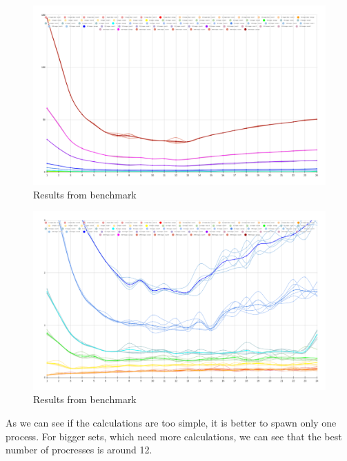 \begin{figure}[H]
    \centering
    \includegraphics[width=18cm]{images/perfsAll.png}
    \caption{Results from benchmark}
    \label{fig:benchmarkRes}
\end{figure}
\begin{figure}[H]
    \centering
    \includegraphics[width=18cm]{images/perfsAllZoomed.png}
    \caption{Results from benchmark}
    \label{fig:benchmarkResZoomed}
\end{figure}
As we can see if the calculations are too simple, it is better to spawn only one process.
For bigger sets, which need more calculations, we can see that the best number of procresses is around 12.

